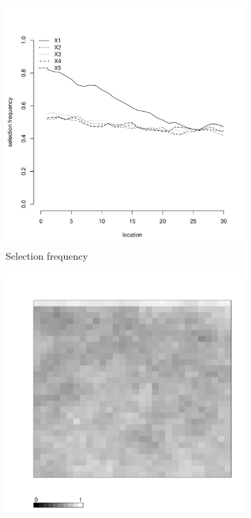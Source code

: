 \documentclass[authoryear, review, 11pt]{elsarticle}
\begin{document}
\begin{figure}
\begin{subfigure}[b]{0.45\textwidth}
		\includegraphics[width=\textwidth]{../../figures/simulation/15.22.profile_selection.pdf}
		\caption{Selection frequency}
	\end{subfigure}
	\begin{subfigure}[b]{0.45\textwidth}
	\centering
		\includegraphics[width=\textwidth]{../../figures/simulation/X1.15.22.unshrunk_bootstrap_coverage.pdf}

\end{subfigure}
\end{figure}
\end{document}
